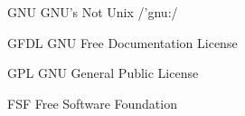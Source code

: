 \begin{denotation}
\item[GNU] GNU's Not Unix /'gnu:/
\item[GFDL] GNU Free Documentation License
\item[GPL] GNU General Public License
\item[FSF] Free Software Foundation
\end{denotation}

